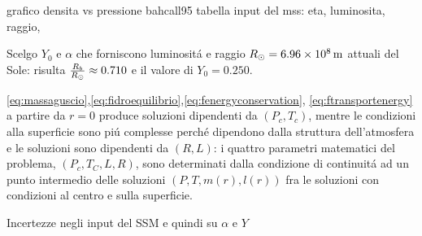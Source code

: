 \documentclass[../main.tex]{subfiles}
\begin{document}
\endgroup

\begingroup
\color{midnightblue}
grafico densita vs pressione bahcall95
tabella input del mss: eta, luminosita, raggio,
\endgroup

Scelgo $Y_0$ e $\alpha$ che forniscono luminosit\'a e raggio $R_{\odot}{}=\SI{6.96e8}{\meter}$ attuali del Sole: risulta $\frac{R_b}{R_{\odot}{}}\approx0.710$ e il valore di $Y_0=0.250$.

\begingroup
\color{yellow}

\eqref{eq:massaguscio},\eqref{eq:fidroequilibrio},\eqref{eq:fenergyconservation}, \eqref{eq:ftransportenergy} a partire da $r=0$ produce soluzioni dipendenti da $(P_c,T_c)$, mentre le condizioni alla superficie sono pi\'u complesse perch\'e dipendono dalla struttura dell'atmosfera e le soluzioni sono dipendenti da $(R,L)$: i quattro parametri matematici del problema, $(P_c,T_C,L,R)$, sono determinati dalla condizione di continuit\'a ad un punto intermedio  delle soluzioni $(P,T,m(r),l(r))$ fra le soluzioni con condizioni al centro e sulla superficie.
\endgroup


\begingroup
\color{midnightblue}
Incertezze negli input del SSM e quindi su $\alpha$ e $Y$
\endgroup
\end{document}
